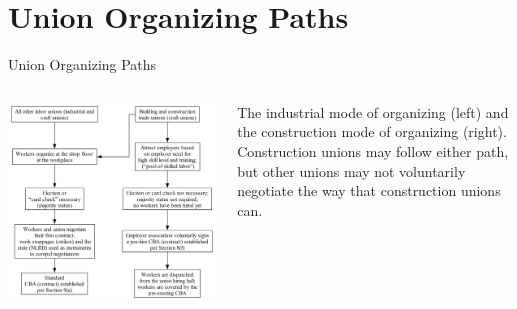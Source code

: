 \documentclass{beamer}
\begin{document}
\section{Union Organizing Paths}
\begin{frame}{Union Organizing Paths}
  \begin{columns}
    \includegraphics[width=0.9\linewidth]{../images/organizing_paths}

    The industrial mode of organizing (left) and the construction mode of organizing (right).\newline\newline
    Construction unions may follow either path, but other unions may not voluntarily negotiate the way that construction unions can.
    \end{columns}
\end{frame}
\end{document}
